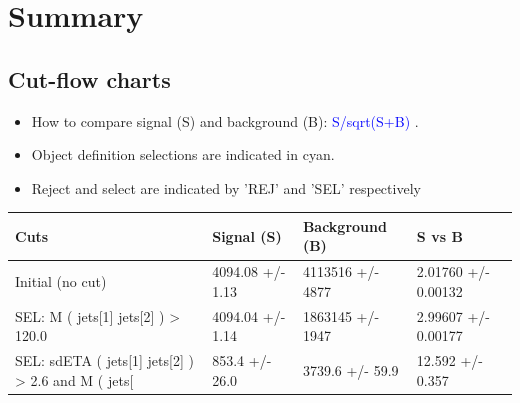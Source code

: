 \documentclass[a4paper, 10pt]{article}
\begin{document}
\newpage
\section{ Summary}

\subsection{Cut-flow charts}

\begin{itemize}
  \item How to compare signal (S) and background (B): \textcolor{blue}{S/\-sqrt(S+B)} .
   \item Object definition selections are indicated in cyan.  \item Reject and select are indicated by 'REJ' and 'SEL' respectively
\end{itemize}
\begin{table}[H]
  \begin{center}
    \begin{tabular}{|m{36.0mm}|m{36.0mm}|m{36.0mm}|m{33.0mm}|}
      \hline
      {\cellcolor{yellow}        Cuts}& {\cellcolor{yellow}         Signal (S)}& {\cellcolor{yellow}         Background (B)}& {\cellcolor{yellow}         S vs B}\\
      \hline
      {\cellcolor{white}         Initial (no cut)}& {\cellcolor{white}         4094.08 +/\-- 1.13}& {\cellcolor{white}         4113516 +/\-- 4877}& {\cellcolor{white}         2.01760 +/\-- 0.00132}\\
      \hline
      {\cellcolor{white} SEL: M ( jets[1] jets[2] ) > 120.0}& {\cellcolor{white}         4094.04 +/\-- 1.14}& {\cellcolor{white}         1863145 +/\-- 1947}& {\cellcolor{white}         2.99607 +/\-- 0.00177}\\
      \hline
      {\cellcolor{white} SEL: sdETA ( jets[1] jets[2] ) > 2.6 and M ( jets[}& {\cellcolor{white}         853.4 +/\-- 26.0}& {\cellcolor{white}         3739.6 +/\-- 59.9}& {\cellcolor{white}         12.592 +/\-- 0.357}\\
\hline
    \end{tabular}
  \end{center}
\end{table}
\end{document}
